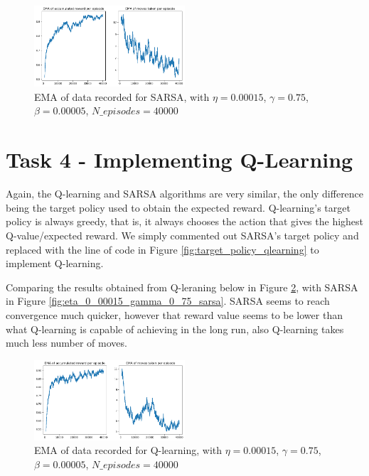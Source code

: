 \documentclass[conference]{IEEEtran}
\begin{document}
\begin{figure}[htbp]
\centerline{\includegraphics[width=0.5\textwidth]{images/eta_0_00015_gamma_0_75_beta_0_00005_sarsa.png}}
\caption{EMA of data recorded for SARSA, with $\eta=0.00015$, $\gamma=0.75$, $\beta=0.00005$, $N\_episodes=40000$}
\label{fig:eta_0_00015_gamma_0_75_beta_0_00005_sarsa}
\end{figure}


\section{Task 4 - Implementing Q-Learning}
Again, the Q-learning and SARSA algorithms are very similar, the only difference being the target policy used to obtain the expected reward. Q-learning's target policy is always greedy, that is, it always chooses the action that gives the highest Q-value/expected reward. We simply commented out SARSA's target policy and replaced with the line of code in Figure \ref{fig:target_policy_qlearning} to implement Q-learning.

Comparing the results obtained from Q-leraning below in Figure \ref{fig:eta_0_00015_gamma_0_75_qlearning}, with SARSA in Figure \ref{fig:eta_0_00015_gamma_0_75_sarsa}. SARSA seems to reach convergence much quicker, however that reward value seems to be lower than what Q-learning is capable of achieving in the long run, also Q-learning takes much less number of moves.

\begin{figure}[htbp]
\centerline{\includegraphics[width=0.5\textwidth]{images/eta_0_00015_gamma_0_75_qlearning.png}}
\caption{EMA of data recorded for Q-learning, with $\eta=0.00015$, $\gamma=0.75$, $\beta=0.00005$, $N\_episodes=40000$}
\label{fig:eta_0_00015_gamma_0_75_qlearning}
\end{figure}
\end{document}
